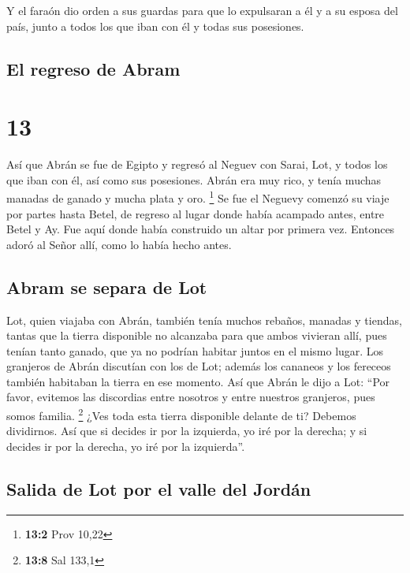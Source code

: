  Y el faraón dio orden a sus guardas para que lo
expulsaran a él y a su esposa del país, junto a todos los que iban con
él y todas sus posesiones.

\hypertarget{el-regreso-de-abram}{%
\subsection{El regreso de Abram}\label{el-regreso-de-abram}}

\hypertarget{section-12}{%
\section{13}\label{section-12}}

 Así que Abrán se fue de Egipto y regresó al Neguev con
Sarai, Lot, y todos los que iban con él, así como sus posesiones.
 Abrán era muy rico, y tenía muchas manadas de ganado y
mucha plata y oro. \footnote{\textbf{13:2} Prov 10,22}  Se
fue el Neguevy comenzó su viaje por partes hasta Betel, de regreso al
lugar donde había acampado antes, entre Betel y Ay.  Fue
aquí donde había construido un altar por primera vez. Entonces adoró al
Señor allí, como lo había hecho antes.

\hypertarget{abram-se-separa-de-lot}{%
\subsection{Abram se separa de Lot}\label{abram-se-separa-de-lot}}

 Lot, quien viajaba con Abrán, también tenía muchos
rebaños, manadas y tiendas,  tantas que la tierra
disponible no alcanzaba para que ambos vivieran allí, pues tenían tanto
ganado, que ya no podrían habitar juntos en el mismo lugar.
 Los granjeros de Abrán discutían con los de Lot; además
los cananeos y los fereceos también habitaban la tierra en ese momento.
 Así que Abrán le dijo a Lot: ``Por favor, evitemos las
discordias entre nosotros y entre nuestros granjeros, pues somos
familia. \footnote{\textbf{13:8} Sal 133,1}  ¿Ves toda
esta tierra disponible delante de ti? Debemos dividirnos. Así que si
decides ir por la izquierda, yo iré por la derecha; y si decides ir por
la derecha, yo iré por la izquierda''.

\hypertarget{salida-de-lot-por-el-valle-del-jorduxe1n}{%
\subsection{Salida de Lot por el valle del
Jordán}\label{salida-de-lot-por-el-valle-del-jorduxe1n}}


